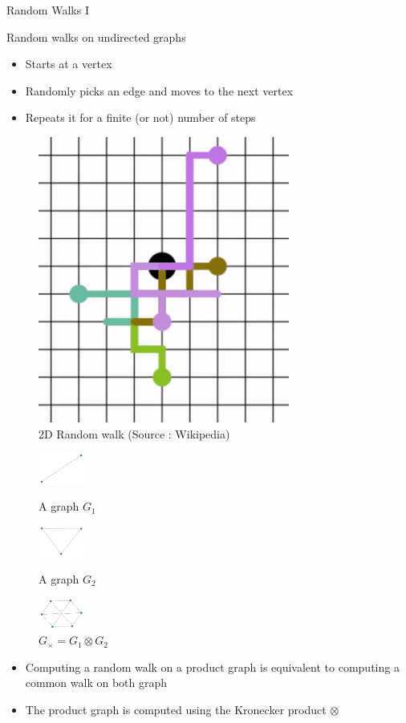 \documentclass[compress]{beamer}
\begin{document}
\begin{frame}{Random Walks I}
\begin{multicols}{2}
	Random walks on undirected graphs 
	\begin{itemize}
		\item Starts at a vertex
		\item Randomly picks an edge and moves to the next vertex
		\item Repeats it for a finite (or not) number of steps
	\end{itemize}
	\begin{figure}
		\includegraphics[height=.25\textheight]{data/randomwalk.png}
		\caption*{2D Random walk (Source : Wikipedia)}
	\end{figure}
\end{multicols}
\vspace*{-0.8cm}
\begin{figure}
\begin{multicols}{3}
\includegraphics[width=1.5cm]{data/prod_graph/g1.png}\caption*{A graph $G_1$}\par
\includegraphics[width=1.5cm]{data/prod_graph/g2.png}\caption*{A graph $G_2$}\par
\includegraphics[width=1.5cm]{data/prod_graph/gx.png}\caption*{$G_{\times}=G_1 \otimes G_2$}\par
\end{multicols}
\end{figure}
\begin{itemize}
	\item Computing a random walk on a product graph is equivalent to computing a common walk on both graph \citep{imrich2000product}
	\item The product graph is computed using the Kronecker product $\otimes$
\end{itemize}
\end{frame}
\end{document}
